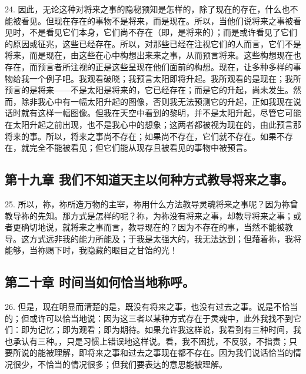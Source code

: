 24. 因此，无论这种对将来之事的隐秘预知是怎样的，除了现在的存在，什么也不能被看见。但现在存在的事物不是将来，而是现在。所以，当他们说将来之事被看见时，不是看见它们本身，它们尚不存在（即，是将来的）；而是或许看见了它们的原因或征兆，这些已经存在。所以，对那些已经在注视它们的人而言，它们不是将来，而是现在，由这些在心中构想出来来之事，从而预言将来。这些构想现在也存在，而预言者所注视的正是这些呈现在他们面前的构想。现在，让多种多样的事物给我一个例子吧。我观看破晓；我预言太阳即将升起。我所观看的是现在；我所预言的是将来——不是太阳是将来的，它已经存在；而是它的升起，尚未发生。然而，除非我心中有一幅太阳升起的图像，否则我无法预测它的升起，正如我现在说话时就有这样一幅图像。但我在天空中看到的黎明，并不是太阳升起，尽管它可能在太阳升起之前出现，也不是我心中的想象；这两者都被视为现在的，由此预言那将来的事。所以，将来之事尚不存在；如果尚不存在，它们就不存在。如果不存在，就完全不能被看见；但它们能从现存且被看见的事物中被预言。\par


\subsection{第十九章 我们不知道天主以何种方式教导将来之事。}

25. 所以，祢，祢所造万物的主宰，祢用什么方法教导灵魂将来之事呢？因为祢曾教导祢的先知。那方式是怎样的呢？祢，为祢没有将来之事，却教导将来之事；或者更确切地说，就将来之事而言，教导现在的？因为不存在的事，当然不能被教导。这方式远非我的能力所能及；于我是太强大的，我无法达到；但藉着祢，我将能够，当祢赐下时，我隐藏的眼目之甘饴的光！\par


\subsection{第二十章 时间当如何恰当地称呼。}

26. 但是，现在明显而清楚的是，既没有将来之事，也没有过去之事。说是不恰当的；但或许可以恰当地说：因为这三者以某种方式存在于灵魂中，此外我找不到它们：即为记忆；即为观看；即为期待。如果允许我这样说，我看到有三种时间，我也承认有三种。，只是习惯上错误地这样说。看，我不困扰，不反驳，不指责；只要所说的能被理解，即将来之事和过去之事现在都不存在。因为我们说话恰当的情况很少，不恰当的情况很多；但我们要表达的意思能被理解。\par

